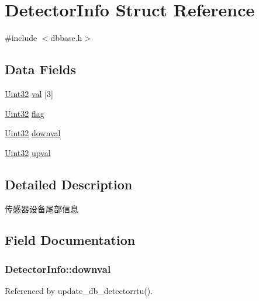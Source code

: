 \hypertarget{structDetectorInfo}{\section{Detector\-Info Struct Reference}
\label{structDetectorInfo}
}


{\ttfamily \#include $<$dbbase.\-h$>$}

\subsection*{Data Fields}
\begin{DoxyCompactItemize}
\item 
\hyperlink{base_8h_a60cf7b3c038ce37a50796e8eaddf0b5f}{Uint32} \hyperlink{structDetectorInfo_a413c1a19e7600530e457efbf839df865}{val} \mbox{[}3\mbox{]}
\item 
\hyperlink{base_8h_a60cf7b3c038ce37a50796e8eaddf0b5f}{Uint32} \hyperlink{structDetectorInfo_a97a917f0d89a2aef284980b3c5c5ea7a}{flag}
\item 
\hyperlink{base_8h_a60cf7b3c038ce37a50796e8eaddf0b5f}{Uint32} \hyperlink{structDetectorInfo_a7022303e238f95e44dbd3eea3a690270}{downval}
\item 
\hyperlink{base_8h_a60cf7b3c038ce37a50796e8eaddf0b5f}{Uint32} \hyperlink{structDetectorInfo_adb7255552b8dfb9eb1506fdd8d6c8105}{upval}
\end{DoxyCompactItemize}


\subsection{Detailed Description}
传感器设备尾部信息 

\subsection{Field Documentation}
\hypertarget{structDetectorInfo_a7022303e238f95e44dbd3eea3a690270}{
\subsubsection[{downval}]{ Detector\-Info\-::downval}}\label{structDetectorInfo_a7022303e238f95e44dbd3eea3a690270}


Referenced by update\-\_\-db\-\_\-detectorrtu().

